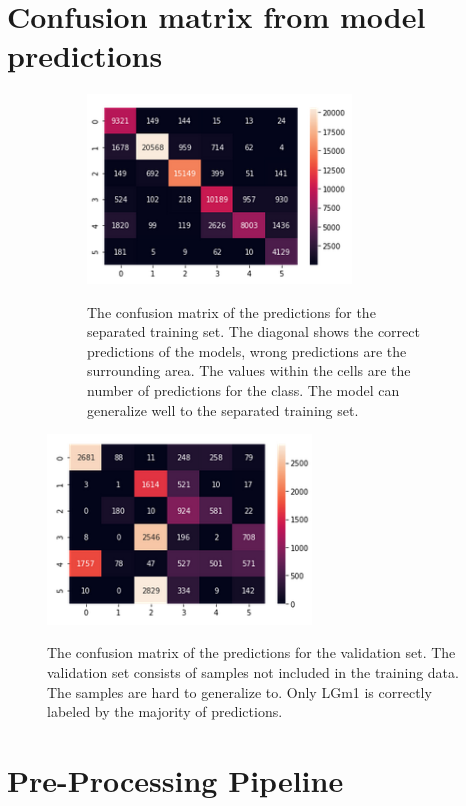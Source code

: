 \documentclass[a4paper, 12pt, oneside]{book}
\begin{document}
\begin{appendices}
\begin{figure}[H]
\end{figure}

\chapter{Confusion matrix from model predictions}
\label{appendix:confm_half}

\begin{figure}[H]

\begin{figure}[H]

    \centering
{\includegraphics[width=7cm]{images/DL/confm_trainhalf.png} }
\caption{The confusion matrix of the predictions for the separated training set. The diagonal shows the correct predictions of the models, wrong predictions are the surrounding area. The values within the cells are the number of predictions for the class. The model can generalize well to the separated training set.}

\end{figure}

    \centering
{\includegraphics[width=7cm]{images/DL/confm_valhalf.png} }
\caption{The confusion matrix of the predictions for the validation set. The validation set consists of samples not included in the training data. The samples are hard to generalize to. Only LGm1 is correctly labeled by the majority of predictions.}

\end{figure}

\chapter{Pre-Processing Pipeline}


\end{appendices}
\end{document}
